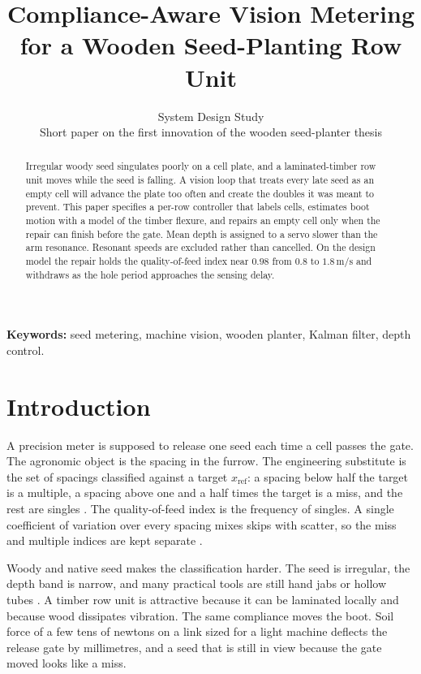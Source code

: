 \documentclass[11pt,a4paper]{article}
\title{Compliance-Aware Vision Metering\\for a Wooden Seed-Planting Row Unit}
\author{System Design Study\\[0.3em]
\large Short paper on the first innovation of the wooden seed-planter thesis}
\date{}
\begin{document}
\maketitle

\begin{abstract}
Irregular woody seed singulates poorly on a cell plate, and a laminated-timber row unit moves while the seed is falling. A vision loop that treats every late seed as an empty cell will advance the plate too often and create the doubles it was meant to prevent. This paper specifies a per-row controller that labels cells, estimates boot motion with a model of the timber flexure, and repairs an empty cell only when the repair can finish before the gate. Mean depth is assigned to a servo slower than the arm resonance. Resonant speeds are excluded rather than cancelled. On the design model the repair holds the quality-of-feed index near \(0.98\) from \(0.8\) to \(1.8\,\mathrm{m/s}\) and withdraws as the hole period approaches the sensing delay.
\end{abstract}

\noindent\textbf{Keywords:} seed metering, machine vision, wooden planter, Kalman filter, depth control.

\section{Introduction}
A precision meter is supposed to release one seed each time a cell passes the gate. The agronomic object is the spacing in the furrow. The engineering substitute is the set of spacings classified against a target \(x_{\mathrm{ref}}\): a spacing below half the target is a multiple, a spacing above one and a half times the target is a miss, and the rest are singles \cite{iso7256,kachman1995}. The quality-of-feed index is the frequency of singles. A single coefficient of variation over every spacing mixes skips with scatter, so the miss and multiple indices are kept separate \cite{kachman1995}.

Woody and native seed makes the classification harder. The seed is irregular, the depth band is narrow, and many practical tools are still hand jabs or hollow tubes \cite{usdaplanter,masarei2019}. A timber row unit is attractive because it can be laminated locally and because wood dissipates vibration. The same compliance moves the boot. Soil force of a few tens of newtons on a link sized for a light machine deflects the release gate by millimetres, and a seed that is still in view because the gate moved looks like a miss.
\end{document}
